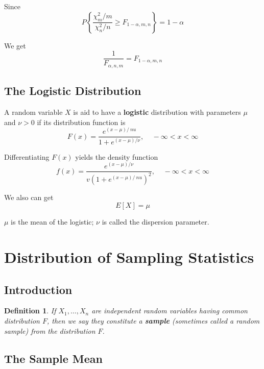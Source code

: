 \documentclass[12pt]{article}
\newtheorem{definition}[theorem]{Definition}
\begin{document}
Since
\begin{equation*}
  P \left\{ \frac{\chi_m^2/m}{\chi_n^2/n} 
    \ge F_{1 - \alpha, m, n} \right \} = 1 - \alpha  
\end{equation*}

We get
\begin{equation*}
  \frac{1}{F_{\alpha, n, m}} = F_{1 - \alpha, m, n}
\end{equation*}

\subsection{The Logistic Distribution}

A random variable $X$ is aid to have a \textbf{logistic} distribution with parameters $\mu$ and $\nu > 0$ if its distribution function is
\begin{equation*}
  F(x) = \frac {e^{(x - \mu)/ \ nu}}{1 + e^{(x - \mu)/ \nu}},
  \;\;\;\; -\infty < x < \infty
\end{equation*}

Differentiating $F(x)$ yields the density function
\begin{equation*}
  f(x) = \frac {e^{(x - \mu)/ \nu}}{v(1 + e^{(x - \mu)/ \ nu})^2},
  \;\;\;\; -\infty < x < \infty
\end{equation*}

We also can get
\begin{equation*}
  E[X] = \mu
\end{equation*}

$\mu$ is the mean of the logistic; $\nu$ is called the dispersion parameter.

\section{Distribution of Sampling Statistics}

\subsection{Introduction}

\begin{definition}
  If $X_1,\dots,X_n$ are independent random variables having common distribution $F$, then we say they constitute a \textbf{sample} (sometimes called a \emph{random sample}) from the distribution $F$.
\end{definition}

\subsection{The Sample Mean}
\end{document}
